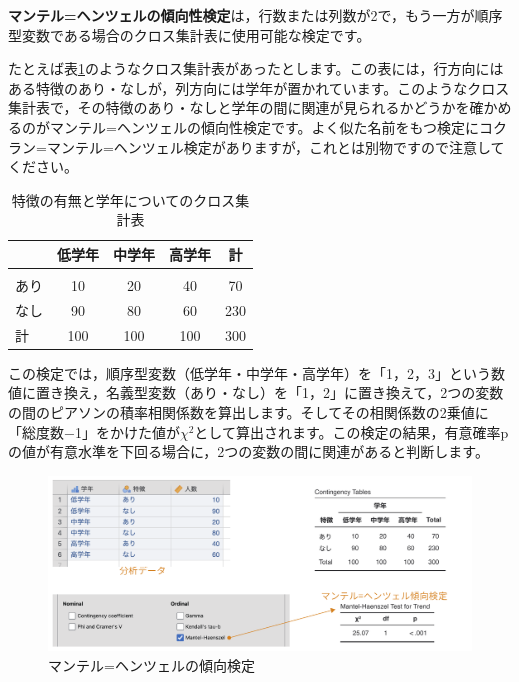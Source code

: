 \documentclass[
  12pt,
  a5jpaper,
  lualatex, ja=standard]{bxjsbook}
\renewcommand{\emph}[1]{\textbf{\color{emph} #1}}
\begin{document}
\emph{マンテル=ヘンツェルの傾向性検定}は，行数または列数が2で，もう一方が順序型変数である場合のクロス集計表に使用可能な検定です。

たとえば表\ref{tab:frequencies-chisq-feature-table}のようなクロス集計表があったとします。この表には，行方向にはある特徴のあり・なしが，列方向には学年が置かれています。このようなクロス集計表で，その特徴のあり・なしと学年の間に関連が見られるかどうかを確かめるのがマンテル=ヘンツェルの傾向性検定です。よく似た名前をもつ検定にコクラン=マンテル=ヘンツェル検定がありますが，これとは別物ですので注意してください。

\begin{table}[H]

\caption{\label{tab:frequencies-chisq-feature-table}特徴の有無と学年についてのクロス集計表}
\centering
\begin{tabular}[t]{lcccc}
\toprule
  & 低学年 & 中学年 & 高学年 & 計\\
\midrule
\addlinespace[0.3em]
\multicolumn{5}{l}{\textbf{特徴}}\\
\hspace{1em}あり & 10 & 20 & 40 & 70\\
\hspace{1em}なし & 90 & 80 & 60 & 230\\
計 & 100 & 100 & 100 & 300\\
\bottomrule
\end{tabular}
\end{table}

この検定では，順序型変数（低学年・中学年・高学年）を「1，2，3」という数値に置き換え，名義型変数（あり・なし）を「1，2」に置き換えて，2つの変数の間のピアソンの積率相関係数を算出します。そしてその相関係数の2乗値に「総度数−1」をかけた値が\(\chi^2\)として算出されます。この検定の結果，有意確率pの値が有意水準を下回る場合に，2つの変数の間に関連があると判断します。

\begin{figure}[!ht]

{\centering \includegraphics[width=1\linewidth]{images/frequencies/chisq-mantel} 

}

\caption{マンテル=ヘンツェルの傾向検定}\label{fig:frequencies-chisq-mantel}
\end{figure}
\end{document}
